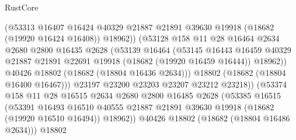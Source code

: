 \begin{lexlean}{RustCore}
\begin{coremodule}
                              (@53313
                                @16407
                                @16424
                                @40329
                                @21887
                                @21891
                                @39630
                                @19918
                                (@18682 (@19920 @16424 @16408))
                                @18962))
                            (@53128
                              @158
                              @11
                              @28
                              @16464
                              @2634
                              @2680
                              @2800
                              @16435
                              @2628
                              (@53139
                                @16464
                                (@53145
                                  @16443
                                  @16459
                                  @40329
                                  @21887
                                  @21891
                                  @22691
                                  @19918
                                  (@18682 (@19920 @16459 @16444))
                                  @18962))
                              @40426
                              @18802
                              (@18682 (@18804 @16436 @2634)))
                            @18802
                            (@18682 (@18804 @16400 @16467)))
                          @23197
                          @23200
                          @23203
                          @23207
                          @23212
                          @23218))
                      (@53374
                        @158
                        @11
                        @28
                        @16515
                        @2634
                        @2680
                        @2800
                        @16485
                        @2628
                        (@53385
                          @16515
                          (@53391
                            @16493
                            @16510
                            @40555
                            @21887
                            @21891
                            @39630
                            @19918
                            (@18682 (@19920 @16510 @16494))
                            @18962))
                        @40426
                        @18802
                        (@18682 (@18804 @16486 @2634)))
                      @18802

\end{coremodule}
\end{lexlean}
